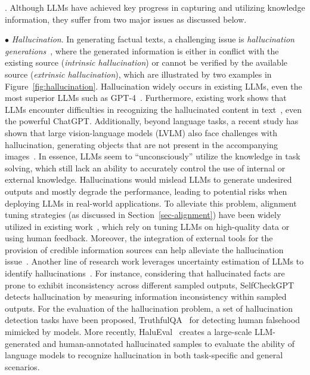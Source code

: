 . Although LLMs have achieved key progress in capturing and utilizing knowledge information, they suffer from two major issues as discussed below.

$\bullet$ \emph{Hallucination}.  In generating factual texts, a challenging issue is \emph{hallucination generations}~\cite{Bang-arxiv-2023-A, Huang-arxiv-2023-A}, where the generated information is either in conflict with the existing source (\emph{intrinsic hallucination}) or cannot be verified by the available source (\emph{extrinsic hallucination}), which are illustrated by two examples in Figure~\ref{fig:hallucination}.
Hallucination widely occurs in existing LLMs, even the most superior LLMs such as GPT-4~\cite{OpenAI-OpenAI-2023-GPT-4}. 
{
Furthermore, existing work shows that LLMs encounter difficulties in recognizing the hallucinated content in text~\cite{Li-arxiv-2023-HaluEval}, even the  powerful ChatGPT. 
Additionally, beyond language tasks, a recent study has shown that large vision-language models (LVLM) also face  challenges with hallucination, \ie  generating objects that are not present in the accompanying images~\cite{Li-arxiv-2023-Evaluating}.
}
In essence, LLMs seem to  ``unconsciously''  utilize the knowledge in task solving, which still lack an ability to accurately control the use of internal or external knowledge.   
Hallucinations would mislead LLMs to generate undesired outputs and mostly degrade the performance, leading to potential risks when deploying LLMs in real-world applications.
To alleviate this problem,  alignment tuning strategies (as discussed in Section~\ref{sec-alignment}) have been widely utilized in existing work~\cite{Ouyang-arxiv-2022-Training}, which rely on tuning LLMs on high-quality data or using human feedback. 
{
Moreover, the integration of external tools for the provision of credible information sources can help alleviate the hallucination issue~\cite{Li-arxiv-2023-HaluEval,Peng-arxiv-2023-Check,Nakano-arxiv-2021-WebGPT}.
Another line of research work leverages uncertainty estimation of LLMs to identify hallucinations~\cite{Kadavath-arxiv-2023-Language,Manakul-arxiv-2023-SelfCheckGPT}.
For instance, considering that hallucinated facts are prone to exhibit inconsistency across different sampled outputs, SelfCheckGPT~\cite{Manakul-arxiv-2023-SelfCheckGPT} detects hallucination by measuring information inconsistency within sampled outputs. 
} 
For the evaluation of the hallucination problem, a set of hallucination detection tasks have been proposed, \eg TruthfulQA~\cite{Lin-ACL-2022-TruthfulQA} for detecting human falsehood mimicked by models. More recently, {HaluEval~\cite{Li-arxiv-2023-HaluEval} creates a large-scale LLM-generated and human-annotated
hallucinated samples to evaluate the ability of language models to recognize hallucination in both task-specific and general scenarios.} 
